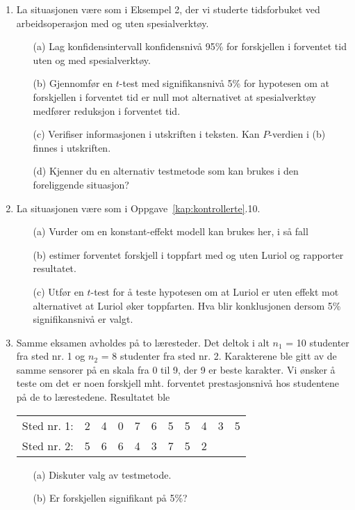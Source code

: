 \begin{enumerate}
\item
La situasjonen være som i Eksempel 2, der vi studerte
tidsforbuket ved arbeidsoperasjon med og uten spesialverktøy.
\begin{itemize}
\item[(a)] Lag konfidensintervall konfidensnivå 95\% for forskjellen
           i forventet tid uten og med spesialverktøy.
\item[(b)] Gjennomfør en $t$-test med signifikansnivå 5\%  for
        hypotesen om at forskjellen i forventet tid er null mot alternativet
          at spesialverktøy medfører reduksjon i forventet tid.
\item[(c)] Verifiser informasjonen i utskriften i teksten. Kan $P$-verdien i
           (b) finnes i utskriften.
\item[(d)] Kjenner du en alternativ testmetode som kan brukes i den
           foreliggende situasjon?
\end{itemize}

\item
La situasjonen være som i Oppgave~\ref*{kap:kontrollerte}.10.

\begin{itemize}
\item[(a)] Vurder om en konstant-effekt modell kan brukes her, i så
           fall
\item[(b)] estimer forventet forskjell i toppfart med og uten Luriol
           og rapporter resultatet.
\item[(c)] Utfør en $t$-test for å teste hypotesen om at Luriol
           er uten effekt mot alternativet at Luriol øker toppfarten.
           Hva blir konklusjonen dersom 5\% signifikansnivå er valgt.
\end{itemize}

\item
Samme eksamen avholdes på to læresteder.  Det deltok i alt
$n_1$ = 10 studenter fra sted nr. 1 og $n_2$ = 8 studenter fra sted
nr. 2.  Karakterene ble gitt av de samme sensorer på en skala fra
0 til 9, der 9 er beste karakter.  Vi ønsker å teste om det er 
noen forskjell mht. forventet prestasjonsnivå hos studentene på
de to lærestedene.  Resultatet ble
\begin{center}
\begin{tabular}{ccccccccccc}
Sted nr. 1: &  2  &  4  &  0  &  7  &  6  &  5  &  5  &  4  &  3  &  5 \\
Sted nr. 2: &  5  &  6  &  6  &  4  &  3  &  7  &  5  &  2  &     &
\end{tabular}
\end{center}
\begin{itemize}
\item[(a)] Diskuter valg av testmetode.
\item[(b)] Er forskjellen signifikant på 5\%?
\end{itemize}


\end{enumerate}
